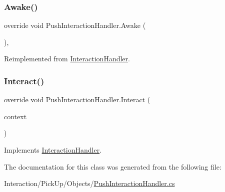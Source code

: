 \subsubsection{\texorpdfstring{Awake()}{Awake()}}
{\footnotesize\ttfamily override void Push\+Interaction\+Handler.\+Awake (\begin{DoxyParamCaption}{ }\end{DoxyParamCaption})\hspace{0.3cm}{\ttfamily [protected]}, {\ttfamily [virtual]}}



Reimplemented from \mbox{\hyperlink{class_interaction_handler_adbbb312d562d3060de296f6da5c97631}{Interaction\+Handler}}.

\mbox{\label{class_push_interaction_handler_af820f5de9628e2f527d5d0f35afc01d7}} 
\subsubsection{\texorpdfstring{Interact()}{Interact()}}
{\footnotesize\ttfamily override void Push\+Interaction\+Handler.\+Interact (\begin{DoxyParamCaption}\item[{\mbox{\hyperlink{class_interaction_context}{Interaction\+Context}}}]{context }\end{DoxyParamCaption})\hspace{0.3cm}{\ttfamily [virtual]}}



Implements \mbox{\hyperlink{class_interaction_handler_ae240fb919621a4e6d5e3dc6130c809d0}{Interaction\+Handler}}.



The documentation for this class was generated from the following file\+:\begin{DoxyCompactItemize}
\item 
Interaction/\+Pick\+Up/\+Objects/\mbox{\hyperlink{_push_interaction_handler_8cs}{Push\+Interaction\+Handler.\+cs}}\end{DoxyCompactItemize}
